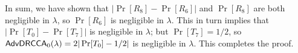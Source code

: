 In sum, we have shown that $|\Pr[R_8]-\Pr[R_6]|$ and $\Pr[R_8]$ are both negligible in $\lambda$, so $\Pr[R_6]$ is negligible in $\lambda$. This in turn implies that $|\Pr[T_0] - \Pr[T_7]|$ is negligible in $\lambda$; but $\Pr[T_7] = 1/2$, so $\mathsf{AdvDRCCA}_0(\lambda) = 2|\Pr[T_0]-1/2|$ is negligible in $\lambda$. This completes the proof.